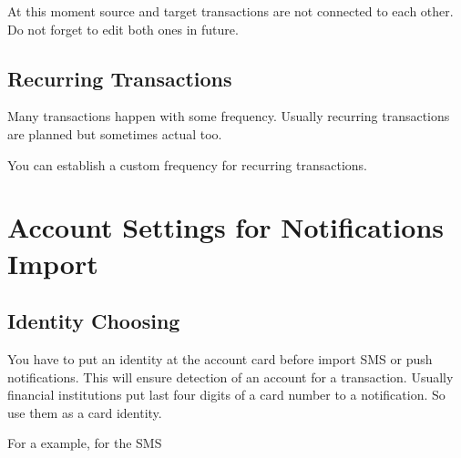 \documentclass[a4paper,10pt,english]{sphinxmanual}
\begin{document}
At this moment source and target transactions are not connected to each other.
Do not forget to edit both ones in future.


\section{Recurring Transactions}
\label{\detokenize{transactions:recurring-transactions}}
Many transactions happen with some frequency. Usually recurring transactions
are planned but sometimes actual too.

You can establish a custom frequency for recurring transactions.

\noindent{}
\noindent{}
\noindent{}
\noindent{}


\chapter{Account Settings for Notifications Import}
\label{\detokenize{account-identities:account-settings-for-notifications-import}}\label{\detokenize{account-identities:chapter-account-identities}}\label{\detokenize{account-identities::doc}}

\section{Identity Choosing}
\label{\detokenize{account-identities:identity-choosing}}
You have to put an identity at the account card before import SMS or push notifications.
This will ensure detection of an account for a transaction. Usually financial institutions
put last four digits of a card number to a notification. So use them as a card identity.

For a example, for the SMS

\begin{sphinxVerbatim}[commandchars=\\\{\}]
        
\end{sphinxVerbatim}
\end{document}
